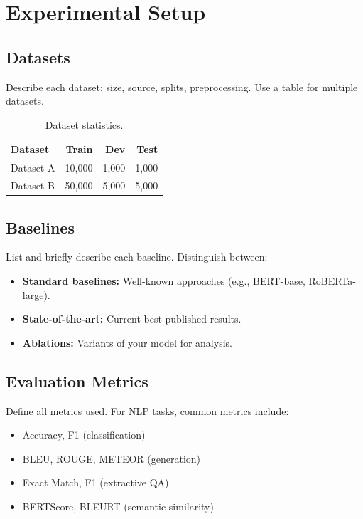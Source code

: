 \documentclass[11pt,a4paper]{article}
\begin{document}
\section{Experimental Setup}

\subsection{Datasets}

Describe each dataset: size, source, splits, preprocessing. Use a table for 
multiple datasets.

\begin{table}[t]
  \centering
  \begin{tabular}{@{}lrrr@{}}
    \toprule
    \textbf{Dataset} & \textbf{Train} & \textbf{Dev} & \textbf{Test} \\
    \midrule
    Dataset A       & 10,000 & 1,000 & 1,000 \\
    Dataset B       & 50,000 & 5,000 & 5,000 \\
    \bottomrule
  \end{tabular}
  \caption{Dataset statistics.}
  \label{tab:datasets}
\end{table}

\subsection{Baselines}

List and briefly describe each baseline. Distinguish between:
\begin{itemize}
  \item \textbf{Standard baselines:} Well-known approaches (e.g., BERT-base, 
    RoBERTa-large).
  \item \textbf{State-of-the-art:} Current best published results.
  \item \textbf{Ablations:} Variants of your model for analysis.
\end{itemize}

\subsection{Evaluation Metrics}

Define all metrics used. For NLP tasks, common metrics include:
\begin{itemize}
  \item Accuracy, F1 (classification)
  \item BLEU, ROUGE, METEOR (generation)
  \item Exact Match, F1 (extractive QA)
  \item BERTScore, BLEURT (semantic similarity)
\end{itemize}
\end{document}
